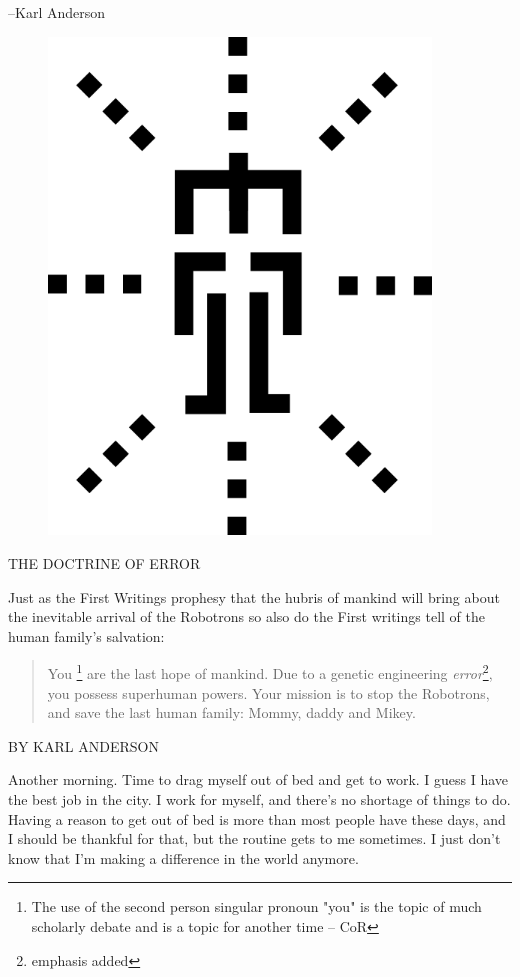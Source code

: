 \documentclass{amsbook}
\begin{document}
--Karl Anderson

\clearpage

\begin{figure}
  \includegraphics[width=4in]{mcor-logo11.png}
\end{figure}

\vskip 72pt

\clearpage
{\ROBOFONTx   THE DOCTRINE OF ERROR}

Just as the First Writings prophesy that the hubris of mankind will
bring about the inevitable arrival of the Robotrons so also do the
First writings tell of the human family's salvation:

\begin{quotation}
You \footnote{The use of the second person singular pronoun "you" is the topic
of much scholarly debate and is a topic for another time -- CoR} are
the last hope of mankind. Due to a genetic engineering {\em error}\footnote{
emphasis added}, you possess superhuman powers. Your mission is to
stop the Robotrons, and save the last human family: Mommy, daddy and
Mikey.
\end{quotation}

\clearpage

{\ROBOFONTx BY KARL ANDERSON}

Another morning.  Time to drag myself out of bed and get to work. I guess I have the best job in the city.  I work for myself, and there's no shortage of things to do.  Having a reason to get out of bed is more than most people have these days, and I should be thankful for that, but the routine gets to me sometimes.  I just don't know that I'm making a difference in the world anymore.
\end{document}
